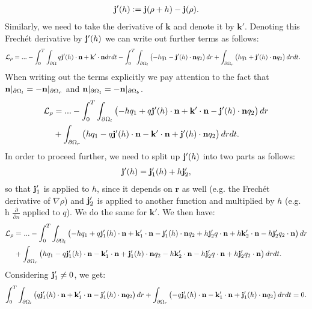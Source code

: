 	\begin{align*}
		\mathbf j'(h) := \mathbf j (\rho + h) - \mathbf j (\rho).
	\end{align*}
	Similarly, we need to take the derivative of $\mathbf k$ and denote it by $\mathbf{k}'$.
	Denoting this Frech\'et derivative by $\mathbf j'(h)$ we can write out further terms as follows:
	\begin{align*}
		\mathcal{L}_\rho &= ... - \int_0^T \int_{\partial \Omega} q \mathbf j'(h)   \cdot \mathbf{n} + \mathbf{k}' \cdot \mathbf{n} dr dt - \int_0^T \int_{\partial \Omega_l} \left(- h q_1 - \mathbf j'(h)  \cdot \mathbf{n} q_2 \right)   dr  + \int_{\partial \Omega_r} \left(h q_1 + \mathbf j'(h)  \cdot \mathbf{n} q_2 \right)   dr dt. 
	\end{align*}
	When writing out the terms explicitly we pay attention to the fact that $\mathbf{n}|_{\partial \Omega_l} = - \mathbf{n}|_{\partial \Omega_r}$ and $\mathbf{n}|_{\partial \Omega_t} = - \mathbf{n}|_{\partial \Omega_b}$.
	\begin{align*}
		\mathcal{L}_\rho &= ... - \int_0^T \int_{\partial \Omega_l} \left(- h q_1 + q \mathbf j'(h)   \cdot \mathbf{n}  + \mathbf{k}' \cdot \mathbf{n}- \mathbf j'(h)  \cdot \mathbf{n} q_2 \right)   dr  \\
		&+ \int_{\partial \Omega_r} \left(h q_1 - q \mathbf j'(h)   \cdot \mathbf{n} - \mathbf{k}' \cdot \mathbf{n}+ \mathbf j'(h)  \cdot \mathbf{n} q_2 \right)   dr dt .
	\end{align*}
	In order to proceed further, we need to split up $\mathbf j'(h)$ into two parts as follows:
	\begin{align*}
		\mathbf j'(h) = \mathbf j'_1(h) + h \mathbf j'_2,
	\end{align*}
	so that $\mathbf j'_1$ is applied to $h$, since it depends on $\mathbf{r}$ as well (e.g. the Frech\'et derivative of $\nabla \rho$) and $\mathbf j'_2$ is applied to another function and multiplied by $h$ (e.g. h $\frac{\partial }{\partial n}$ applied to $q$). We do the same for $\mathbf k'$.
	We then have:
	\begin{align*}
		\mathcal{L}_\rho &= ... - \int_0^T \int_{\partial \Omega_l} \left(- h q_1 + q \mathbf j_1'(h)   \cdot \mathbf{n} + \mathbf{k}_1' \cdot \mathbf{n} - \mathbf j_1'(h)  \cdot \mathbf{n} q_2  + h \mathbf j'_2 q \cdot \mathbf{n} + h \mathbf{k}_2' \cdot \mathbf{n}-  h \mathbf j'_2 q_2 \cdot \mathbf{n} \right)   dr  \\
		&+ \int_{\partial \Omega_r} \left( h q_1 - q \mathbf j_1'(h)   \cdot \mathbf{n} -\mathbf{k}_1' \cdot \mathbf{n}+ \mathbf j_1'(h)  \cdot \mathbf{n} q_2 - h\mathbf{k}_2' \cdot \mathbf{n} - h \mathbf j'_2 q \cdot \mathbf{n} +  h \mathbf j'_2 q_2 \cdot \mathbf{n} \right)   dr dt.
	\end{align*}
	Considering $\mathbf j'_1 \neq 0$, we get:
	\begin{align*}
		\int_0^T \int_{\partial \Omega_l} \left( q \mathbf j_1'(h)   \cdot \mathbf{n}  + \mathbf{k}_1' \cdot \mathbf{n} - \mathbf j_1'(h)  \cdot \mathbf{n} q_2  \right)   dr  + \int_{\partial \Omega_r} \left(-q \mathbf j_1'(h)   \cdot \mathbf{n} - \mathbf{k}_1' \cdot \mathbf{n} + \mathbf j_1'(h)  \cdot \mathbf{n} q_2  \right)   dr dt = 0 .
	\end{align*}
